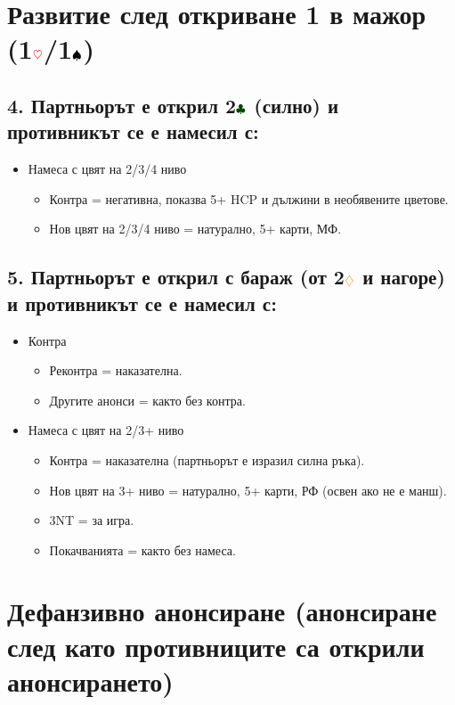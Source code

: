 \documentclass[10pt,a5paper]{extarticle}
\newcommand{\Rheart}{\textcolor{red}{\heartsuit}}
\newcommand{\Rdiamond}{\textcolor{orange}{\diamondsuit}}
\newcommand{\Bspade}{\textcolor{black}{\spadesuit}}
\newcommand{\Bclub}{\textcolor{darkgreen}{\clubsuit}}
\begin{document}
\section{Развитие след откриване 1 в мажор (1$\Rheart$/1$\Bspade$)}

\subsection*{4. Партньорът е открил 2$\Bclub$ (силно) и противникът се е намесил с:}
\begin{itemize}
  \item[] Намеса с цвят на 2/3/4 ниво  
    \begin{itemize}
      \item[] Контра = негативна, показва 5+ HCP и дължини в необявените цветове.  
      \item[] Нов цвят на 2/3/4 ниво = натурално, 5+ карти, МФ.  
    \end{itemize}
\end{itemize}

\subsection*{5. Партньорът е открил с бараж (от 2$\Rdiamond$ и нагоре) и противникът се е намесил с:}
\begin{itemize}
  \item[] Контра  
    \begin{itemize}
      \item[] Реконтра = наказателна.  
      \item[] Другите анонси = както без контра.  
    \end{itemize}
  \item[] Намеса с цвят на 2/3+ ниво  
    \begin{itemize}
      \item[] Контра = наказателна (партньорът е изразил силна ръка).  
      \item[] Нов цвят на 3+ ниво = натурално, 5+ карти, РФ (освен ако не е манш).  
      \item[] 3NT = за игра.  
      \item[] Покачванията = както без намеса.  
    \end{itemize}
\end{itemize}

\section{Дефанзивно анонсиране (анонсиране след като противниците са открили анонсирането)}
\end{document}
